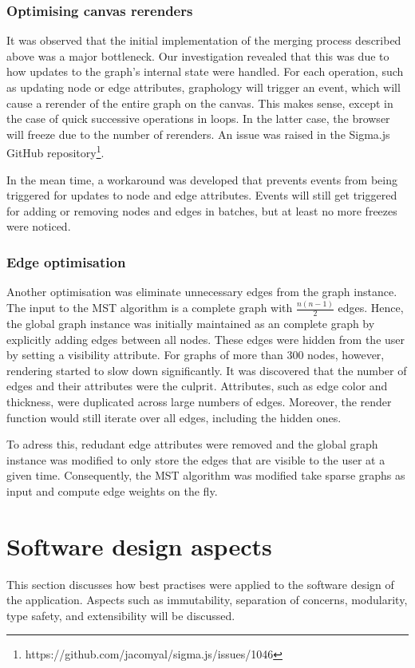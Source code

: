 \documentclass{l4proj}
\begin{document}
\subsubsection{Optimising canvas rerenders}
It was observed that the initial implementation of the merging process described above was a major bottleneck. Our investigation revealed that this was due to how updates to the graph's internal state were handled.
For each operation, such as updating node or edge attributes, graphology will trigger an event, which will cause a rerender of the entire graph on the canvas. This makes sense, except in the case of quick successive operations in loops. In the latter case, the browser will freeze due to the number of rerenders. An issue was raised in the Sigma.js GitHub repository\footnote{https://github.com/jacomyal/sigma.js/issues/1046}.

In the mean time, a workaround was developed that prevents events from being triggered for updates to node and edge attributes. Events will still get triggered for adding or removing nodes and edges in batches, but at least no more freezes were noticed.

\subsubsection{Edge optimisation}
Another optimisation was eliminate unnecessary edges from the graph instance. The input to the MST algorithm is a complete graph with $\frac{n(n-1)}{2}$ edges.
Hence, the global graph instance was initially maintained as an complete graph by explicitly adding edges between all nodes. These edges were hidden from the user by setting a visibility attribute.
For graphs of more than 300 nodes, however, rendering started to slow down significantly. It was discovered that the number of edges and their attributes were the culprit. Attributes, such as edge color and thickness, were duplicated across large numbers of edges. Moreover, the render function would still iterate over all edges, including the hidden ones.

To adress this, redudant edge attributes were removed and the global graph instance was modified to only store the edges that are visible to the user at a given time.
Consequently, the MST algorithm was modified take sparse graphs as input and compute edge weights on the fly.

\section{Software design aspects}
This section discusses how best practises were applied to the software design of the application. Aspects such as immutability, separation of concerns, modularity, type safety, and extensibility will be discussed.
\end{document}
